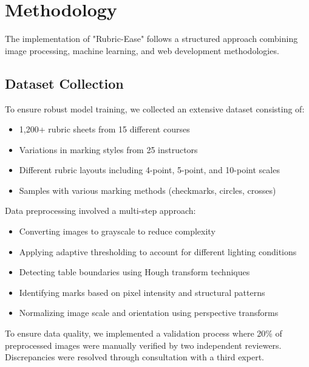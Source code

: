 \documentclass[12pt]{article}
\begin{document}
\section{Methodology}
The implementation of "Rubric-Ease" follows a structured approach combining image processing, machine learning, and web development methodologies.

\subsection{Dataset Collection}
To ensure robust model training, we collected an extensive dataset consisting of:
\begin{itemize}
    \item 1,200+ rubric sheets from 15 different courses
    \item Variations in marking styles from 25 instructors
    \item Different rubric layouts including 4-point, 5-point, and 10-point scales
    \item Samples with various marking methods (checkmarks, circles, crosses)
\end{itemize}

Data preprocessing involved a multi-step approach:
\begin{itemize}
    \item Converting images to grayscale to reduce complexity
    \item Applying adaptive thresholding to account for different lighting conditions
    \item Detecting table boundaries using Hough transform techniques
    \item Identifying marks based on pixel intensity and structural patterns
    \item Normalizing image scale and orientation using perspective transforms
\end{itemize}

To ensure data quality, we implemented a validation process where 20\% of preprocessed images were manually verified by two independent reviewers. Discrepancies were resolved through consultation with a third expert.
\end{document}
